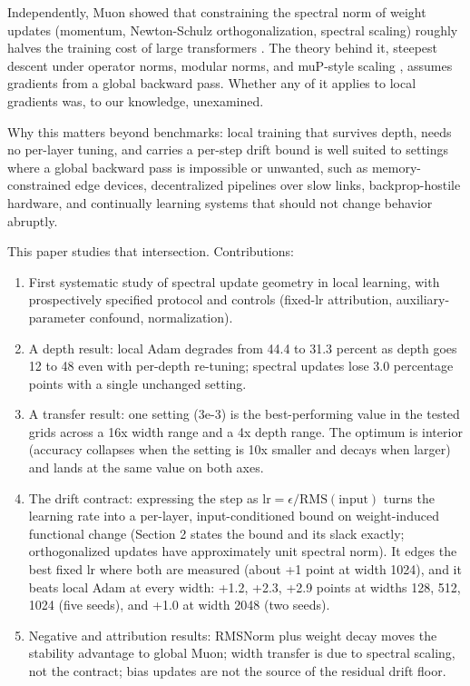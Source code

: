 \documentclass[11pt]{article}
\newcommand{\eps}{\epsilon}
\begin{document}
Independently, Muon \citep{jordan2024muon} showed that constraining the spectral norm of weight updates (momentum, Newton-Schulz orthogonalization, spectral scaling) roughly halves the training cost of large transformers \citep{liu2025muon}. The theory behind it, steepest descent under operator norms, modular norms, and muP-style scaling \citep{bernstein2024old,large2024modular,yang2022tensor}, assumes gradients from a global backward pass. Whether any of it applies to local gradients was, to our knowledge, unexamined.

Why this matters beyond benchmarks: local training that survives depth, needs no per-layer tuning, and carries a per-step drift bound is well suited to settings where a global backward pass is impossible or unwanted, such as memory-constrained edge devices, decentralized pipelines over slow links, backprop-hostile hardware, and continually learning systems that should not change behavior abruptly.

This paper studies that intersection. Contributions:

\begin{enumerate}
\item First systematic study of spectral update geometry in local learning, with prospectively specified protocol and controls (fixed-lr attribution, auxiliary-parameter confound, normalization).
\item A depth result: local Adam degrades from 44.4 to 31.3 percent as depth goes 12 to 48 even with per-depth re-tuning; spectral updates lose 3.0 percentage points with a single unchanged setting.
\item A transfer result: one setting (3e-3) is the best-performing value in the tested grids across a 16x width range and a 4x depth range. The optimum is interior (accuracy collapses when the setting is 10x smaller and decays when larger) and lands at the same value on both axes.
\item The drift contract: expressing the step as $\mathrm{lr} = \eps / \mathrm{RMS}(\text{input})$ turns the learning rate into a per-layer, input-conditioned bound on weight-induced functional change (Section 2 states the bound and its slack exactly; orthogonalized updates have approximately unit spectral norm). It edges the best fixed lr where both are measured (about +1 point at width 1024), and it beats local Adam at every width: +1.2, +2.3, +2.9 points at widths 128, 512, 1024 (five seeds), and +1.0 at width 2048 (two seeds).
\item Negative and attribution results: RMSNorm plus weight decay moves the stability advantage to global Muon; width transfer is due to spectral scaling, not the contract; bias updates are not the source of the residual drift floor.
\end{enumerate}
\end{document}
